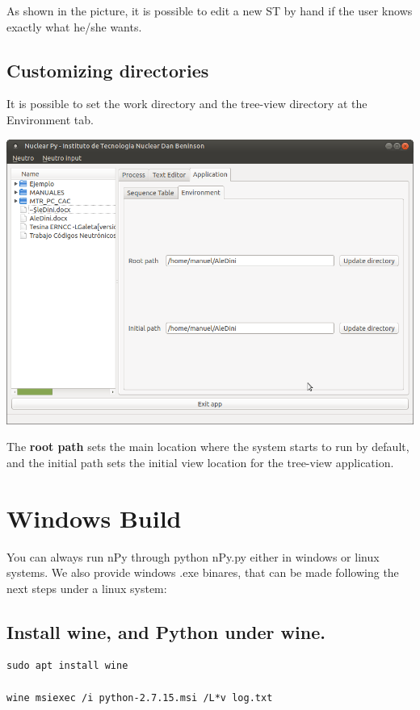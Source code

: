 \documentclass[a4paper,10pt]{article}
\begin{document}
As shown in the picture, it is possible to edit a new ST by hand if the user knows exactly what he/she wants.

\subsection{Customizing directories}

It is possible to set the work directory and the tree-view directory at the Environment tab.

 \begin{center}
 \includegraphics[width=\textwidth]{img/environment.png}
\end{center}

The \textbf{root path} sets the main location where the system starts to run by default, and the initial path sets the initial view location for the tree-view application.

\section{Windows Build}

You can always run nPy through python nPy.py either in windows or linux systems. We also provide windows .exe binares, that can be made following the next steps under a linux system:

\subsection{Install wine, and Python under wine.}
\begin{verbatim}
sudo apt install wine

wine msiexec /i python-2.7.15.msi /L*v log.txt
\end{verbatim}
\end{document}
